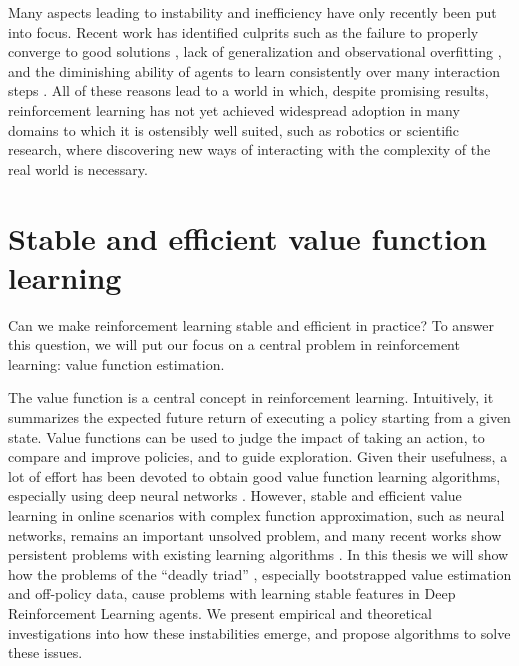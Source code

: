 Many aspects leading to instability and inefficiency have only recently been put into focus.
Recent work has identified culprits such as the failure to properly converge to good solutions \parencite{kumar2021implicit}, lack of generalization and observational overfitting \parencite{song2020observational,kirk2023survey}, and the diminishing ability of agents to learn consistently over many interaction steps \parencite{nikishin2022primacy,hussing2024dissecting}.
All of these reasons lead to a world in which, despite promising results, reinforcement learning has not yet achieved widespread adoption in many domains to which it is ostensibly well suited, such as robotics or scientific research, where discovering new ways of interacting with the complexity of the real world is necessary.


\section{Stable and efficient value function learning}

Can we make reinforcement learning stable and efficient in practice?
To answer this question, we will put our focus on a central problem in reinforcement learning: value function estimation.

The value function is a central concept in reinforcement learning.
Intuitively, it summarizes the expected future return of executing a policy starting from a given state.
Value functions can be used to judge the impact of taking an action, to compare and improve policies, and to guide exploration.
Given their usefulness, a lot of effort has been devoted to obtain good value function learning algorithms, especially using deep neural networks \parencite{dqn,hasselt2010double,hasselt2016deep,fujimoto2018addressing,sac,hussing2024dissecting}.
However, stable and efficient value learning in online scenarios with complex function approximation, such as neural networks, remains an important unsolved problem, and many recent works show persistent problems with existing learning algorithms \parencite{kumar2021implicit,nikishin2022primacy,hussing2024dissecting}.
In this thesis we will show how the problems of the ``deadly triad'' \parencite{suttonbook}, especially bootstrapped value estimation and off-policy data, cause problems with learning stable features in Deep Reinforcement Learning agents.
We present empirical and theoretical investigations into how these instabilities emerge, and propose algorithms to solve these issues.


